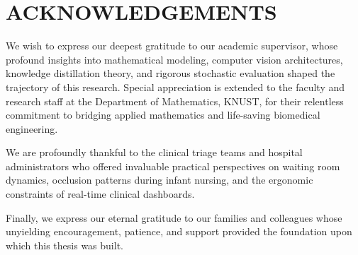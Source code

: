 \chapter*{ACKNOWLEDGEMENTS}

We wish to express our deepest gratitude to our academic supervisor, whose profound insights into mathematical modeling, computer vision architectures, knowledge distillation theory, and rigorous stochastic evaluation shaped the trajectory of this research. Special appreciation is extended to the faculty and research staff at the Department of Mathematics, KNUST, for their relentless commitment to bridging applied mathematics and life-saving biomedical engineering.

We are profoundly thankful to the clinical triage teams and hospital administrators who offered invaluable practical perspectives on waiting room dynamics, occlusion patterns during infant nursing, and the ergonomic constraints of real-time clinical dashboards. 

Finally, we express our eternal gratitude to our families and colleagues whose unyielding encouragement, patience, and support provided the foundation upon which this thesis was built.
